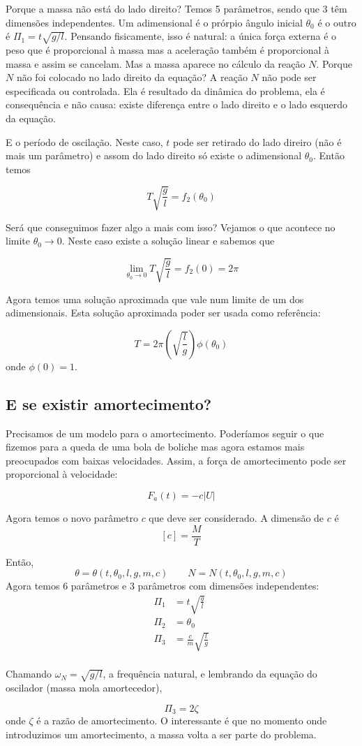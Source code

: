 Porque a massa não está do lado direito? Temos 5 parâmetros, sendo que 3 têm dimensões independentes. Um adimensional é o prórpio ângulo inicial $\theta_0$ é o outro é $\Pi_1 = t\sqrt{g/l}$. Pensando fisicamente, isso é natural: a única força externa é o peso que é proporcional à massa mas a aceleração também é proporcional à massa e assim se cancelam. Mas a massa aparece no cálculo da reação $N$. Porque $N$ não foi colocado no lado direito da equação? A reação $N$ não pode ser especificada ou controlada. Ela é resultado da dinâmica do problema, ela é consequência e não causa: existe diferença entre o lado direito e o lado esquerdo da equação.

E o período de oscilação. Neste caso, $t$ pode ser retirado do lado direiro (não é mais um parâmetro) e assom do lado direito só existe o adimensional $\theta_0$. Então temos

\[
T\sqrt{\frac{g}{l}} = f_2(\theta_0)
\]

Será que conseguimos fazer algo a mais com isso? Vejamos o que acontece no limite $\theta_0\longrightarrow 0$. Neste caso existe a solução linear e sabemos que

\[
\lim_{\theta_0\rightarrow 0}T\sqrt{\frac{g}{l}} = f_2(0) = 2\pi
\]

Agora temos uma solução aproximada que vale num limite de um dos adimensionais. Esta solução aproximada poder ser usada como referência:

\[
T = 2\pi\left(\sqrt{\frac{l}{g}}\right) \phi(\theta_0)
\]
onde $\phi(0) = 1$.

\subsection{E se existir amortecimento?}

Precisamos de um modelo para o amortecimento. Poderíamos seguir o que fizemos para a queda de uma bola de boliche mas agora estamos mais preocupados com baixas velocidades. Assim, a força de amortecimento pode ser proporcional à velocidade:

\[
F_a(t) = -c |U|
\]

Agora temos o novo parâmetro $c$ que deve ser considerado. A dimensão de $c$ é
\[
[c] = \frac{M}{T}
\]

Então, 
\[
\theta = \theta(t, \theta_0, l, g, m, c) \qquad N = N(t, \theta_0, l, g, m, c)
\]
Agora temos 6 parâmetros e 3 parâmetros com dimensões independentes:
\[
\begin{aligned}
  \Pi_1 &= t\sqrt{\frac{g}{l}} \\
  \Pi_2 &= \theta_0 \\
  \Pi_3 &= \frac{c}{m}\sqrt{\frac{l}{g}} \\
\end{aligned}
\]

Chamando $\omega_N = \sqrt{g/l}$, a frequência natural, e lembrando da equação do oscilador (massa mola amortecedor),

\[
\Pi_3 = 2\zeta
\]
onde $\zeta$ é a razão de amortecimento. O interessante é que no momento onde introduzimos um amortecimento, a massa volta a ser parte do problema.




